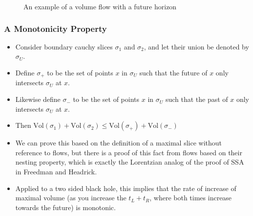 \documentclass[8pt,aspectratio=169]{beamer}
\begin{document}
\begin{frame}
\begin{minipage}[t]{0.44\linewidth}
\begin{figure}
\begin{center}
    \end{center}
    \caption{An example of a volume flow with a future horizon}
    \label{fig:WDW}
\end{figure}

\end{minipage}

\end{frame}

\begin{frame}
\frametitle{A Monotonicity Property}

\begin{minipage}[t]{0.55\linewidth}

\begin{itemize}

\item Consider boundary cauchy slices $\sigma_1$ and $\sigma_2$, and let their union be denoted by $\sigma_U$. 

\item Define $\sigma_+$ to be the set of points $x$ in $\sigma_U$ such that the future of $x$ only intersects $\sigma_U$ at $x$.

\item Likewise define $\sigma_-$ to be the set of points $x$ in $\sigma_U$ such that the past of $x$ only intersects $\sigma_U$ at $x$.

\item Then $\text{Vol}(\sigma_1) + \text{Vol}(\sigma_2) \leq \text{Vol}(\sigma_+) + \text{Vol}(\sigma_-)$

\item We can prove this based on the definition of a maximal slice without reference to flows, but there is a proof of this fact from flows based on their nesting property, which is exactly the Lorentzian analog of the proof of SSA in Freedman and Headrick.

\item Applied to a two sided black hole, this implies that the rate of increase of maximal volume (as you increase the $t_L + t_R$, where both times increase towards the future) is monotonic. 

\end{itemize}

\end{minipage}\hfill
%
\begin{minipage}[t]{0.42\linewidth}

\begin{figure}
    \begin{center}
    

\end{center}
\end{figure}
\end{minipage}
\end{frame}
\end{document}
